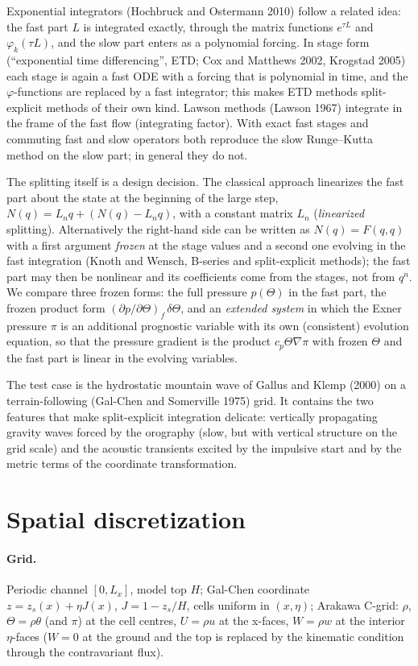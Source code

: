 \documentclass[11pt,a4paper]{article}
\begin{document}
Exponential integrators (Hochbruck and Ostermann 2010) follow a related idea: the fast part $L$ is
integrated exactly, through the matrix functions $e^{\tau L}$ and $\varphi_k(\tau L)$, and the slow
part enters as a polynomial forcing. In stage form (``exponential time differencing'', ETD; Cox and
Matthews 2002, Krogstad 2005) each stage is again a fast ODE with a forcing that is polynomial in
time, and the $\varphi$-functions are replaced by a fast integrator; this makes ETD methods
split-explicit methods of their own kind. Lawson methods (Lawson 1967) integrate in the frame of the
fast flow (integrating factor). With exact fast stages and commuting fast and slow operators both
reproduce the slow Runge--Kutta method on the slow part; in general they do not.

The splitting itself is a design decision. The classical approach linearizes the fast part about the
state at the beginning of the large step, $N(q)=L_nq+(N(q)-L_nq)$, with a constant matrix $L_n$
(\emph{linearized} splitting). Alternatively the right-hand side can be written as
$N(q)=F(q,q)$ with a first argument \emph{frozen} at the stage values and a second one evolving in the
fast integration (Knoth and Wensch, B-series and split-explicit methods); the fast part may then be
nonlinear and its coefficients come from the stages, not from $q^n$. We compare three frozen forms:
the full pressure $p(\Theta)$ in the fast part, the frozen product form $(\partial p/\partial\Theta)_f
\,\delta\Theta$, and an \emph{extended system} in which the Exner pressure $\pi$ is an additional
prognostic variable with its own (consistent) evolution equation, so that the pressure gradient is
the product $c_p\Theta\nabla\pi$ with frozen $\Theta$ and the fast part is linear in the evolving
variables.

The test case is the hydrostatic mountain wave of Gallus and Klemp (2000) on a terrain-following
(Gal-Chen and Somerville 1975) grid. It contains the two features that make split-explicit
integration delicate: vertically propagating gravity waves forced by the orography (slow, but with
vertical structure on the grid scale) and the acoustic transients excited by the impulsive start and
by the metric terms of the coordinate transformation.

\section{Spatial discretization}
\paragraph{Grid.} Periodic channel $[0,L_x]$, model top $H$; Gal-Chen coordinate
$z=z_s(x)+\eta J(x)$, $J=1-z_s/H$, cells uniform in $(x,\eta)$; Arakawa C-grid: $\rho$, $\Theta=\rho\theta$
(and $\pi$) at the cell centres, $U=\rho u$ at the x-faces, $W=\rho w$ at the interior $\eta$-faces
($W=0$ at the ground and the top is replaced by the kinematic condition through the contravariant
flux).
\end{document}
